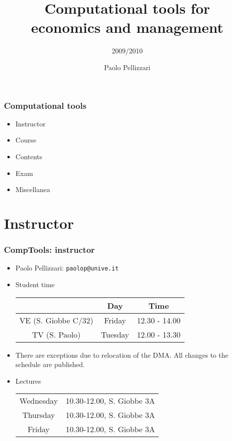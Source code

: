 \documentclass[handout,a4paper]{beamer} 			%
\title{Computational tools for \\economics and management}
\subtitle{2009/2010}
\author{Paolo Pellizzari}
\begin{document}
\maketitle

\begin{frame}
    \frametitle{Computational tools}
    \begin{itemize}
        \item Instructor
    
        \item Course
    
        \item Contents
	
	\item Exam
	
	\item Miscellanea
    \end{itemize}
\end{frame}

\section{Instructor}
\begin{frame}
    \frametitle{CompTools: instructor}

\begin{itemize}
	    \item Paolo Pellizzari: \texttt{paolop@unive.it}
	
  	    \item Student time \begin{tabular}{ccc}
  	        
  	         & Day & Time  \\
		 \hline  	        
  	        VE (S. Giobbe C/32) & Friday & 12.30 - 14.00  \\
  	        
  	        TV (S. Paolo) & Tuesday & 12.00 - 13.30
  	    \end{tabular}
	    
	    \item \alert{There are exceptions due to relocation of the
	    DMA}.  All changes to the schedule are published.
	    
	    \item Lectures \medskip
	    
	    \begin{tabular}{c|l}
	        
	        Wednesday & 10.30-12.00, S. Giobbe 3A  \\
	        
	        Thursday & 10.30-12.00, S. Giobbe 3A \\
	        
	        Friday & 10.30-12.00, S. Giobbe 3A \\
	        
	         
	    \end{tabular}
	\end{itemize}
\end{frame}
\end{document}
